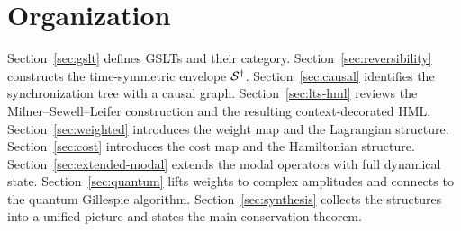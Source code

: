\section{Organization}

Section~\ref{sec:gslt} defines GSLTs and their category.
Section~\ref{sec:reversibility} constructs the time-symmetric envelope $\mathcal{S}^\dagger$.
Section~\ref{sec:causal} identifies the synchronization tree with a causal graph.
Section~\ref{sec:lts-hml} reviews the Milner--Sewell--Leifer construction and
the resulting context-decorated HML.
Section~\ref{sec:weighted} introduces the weight map and the Lagrangian structure.
Section~\ref{sec:cost} introduces the cost map and the Hamiltonian structure.
Section~\ref{sec:extended-modal} extends the modal operators with full dynamical state.
Section~\ref{sec:quantum} lifts weights to complex amplitudes and connects to the
quantum Gillespie algorithm.
Section~\ref{sec:synthesis} collects the structures into a unified picture and
states the main conservation theorem.

